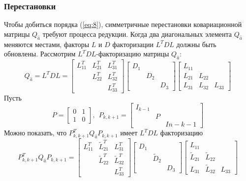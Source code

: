 \documentclass[12pt]{matmex-diploma}
\begin{document}
\subsubsection{Перестановки}
Чтобы добиться порядка (\ref{eq:8}), симметричные перестановки ковариационной
матрицы $Q_{\hat{a}}$ требуют процесса редукции. Когда два диагональных элемента
$Q_{\hat{a}}$ меняются местами, факторы $L$ и $D$ факторизации $L^T D L$ должны
быть обновлены. Рассмотрим $L^T D L$-факторизацию матрицы $Q_{\hat{a}}$:
\begin{equation*}
     Q_{\hat{a}} = L^T D L = 
     \begin{bmatrix}
     L^T_{11} & L^T_{21} & L^T_{31} \\
     & L^T_{22} & L^T_{32} \\
     & & L^T_{33}
     \end{bmatrix}
     \begin{bmatrix}
     D_1 & &  \\
     & D_2 & \\
     & & D_3
     \end{bmatrix}
     \begin{bmatrix}
     L_{11} & &  \\
     L_{21} & L_{22} & \\
     L_{31} & L_{32} & L_{33}
     \end{bmatrix}
\end{equation*}
Пусть
\begin{equation*}
     P = 
     \begin{bmatrix}
     0 & 1 \\
     1 & 0
     \end{bmatrix}, \ \
     P_{k,k+1} = 
     \begin{bmatrix}
     I_{k-1} & &  \\
     & P & \\
     & & I{n-k-1}
     \end{bmatrix}
     \label{eq:9}
\end{equation*}
Можно показать, что $P^T_{k,k+1} Q_{\hat{a}} P_{k,k+1}$ имеет $L^T D L$ факторизацию
\begin{equation}
     P^T_{k,k+1} Q_{\hat{a}} P_{k,k+1} = 
     \begin{bmatrix}
     L^T_{11} & \tilde{L}^T_{21} & L^T_{31} \\
     & \tilde{L}^T_{22} & \tilde{L}^T_{32} \\
     & & L^T_{33}
     \end{bmatrix}
     \begin{bmatrix}
     D_1 & &  \\
     & \tilde{D}_2 & \\
     & & D_3
     \end{bmatrix}
     \begin{bmatrix}
     L_{11} & &  \\
     \tilde{L}_{21} & \tilde{L}_{22} & \\
     L_{31} & \tilde{L}_{32} & L_{33}
     \end{bmatrix}
     \label{eq:10}
\end{equation}
\end{document}
